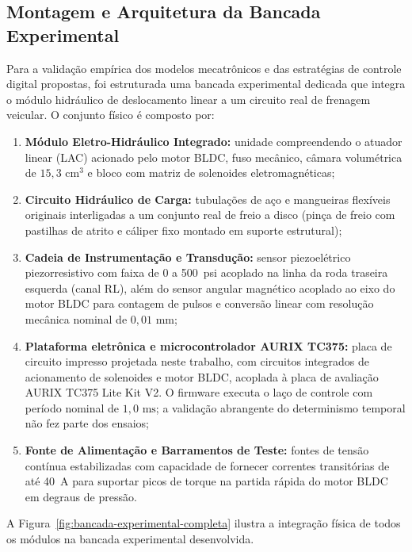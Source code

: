 \subsection{Montagem e Arquitetura da Bancada Experimental}
\label{sec:metodologia-bancada-fisica}

Para a validação empírica dos modelos mecatrônicos e das estratégias de controle digital propostas, foi estruturada uma bancada experimental dedicada que integra o módulo hidráulico de deslocamento linear a um circuito real de frenagem veicular. O conjunto físico é composto por:
\begin{enumerate}
    \item \textbf{Módulo Eletro-Hidráulico Integrado:} unidade compreendendo o atuador linear (LAC) acionado pelo motor BLDC, fuso mecânico, câmara volumétrica de $15{,}3\text{ cm}^3$ e bloco com matriz de solenoides eletromagnéticas;
    \item \textbf{Circuito Hidráulico de Carga:} tubulações de aço e mangueiras flexíveis originais interligadas a um conjunto real de freio a disco (pinça de freio com pastilhas de atrito e cáliper fixo montado em suporte estrutural);
    \item \textbf{Cadeia de Instrumentação e Transdução:} sensor piezoelétrico piezorresistivo com faixa de 0 a 500~psi acoplado na linha da roda traseira esquerda (canal RL), além do sensor angular magnético acoplado ao eixo do motor BLDC para contagem de pulsos e conversão linear com resolução mecânica nominal de $0{,}01\text{ mm}$;
    \item \textbf{Plataforma eletrônica e microcontrolador AURIX TC375:} placa de circuito impresso projetada neste trabalho, com circuitos integrados de acionamento de solenoides e motor BLDC, acoplada à placa de avaliação AURIX TC375 Lite Kit V2. O firmware executa o laço de controle com período nominal de $1{,}0\text{ ms}$; a validação abrangente do determinismo temporal não fez parte dos ensaios;
    \item \textbf{Fonte de Alimentação e Barramentos de Teste:} fontes de tensão contínua estabilizadas com capacidade de fornecer correntes transitórias de até 40~A para suportar picos de torque na partida rápida do motor BLDC em degraus de pressão.
\end{enumerate}

A Figura~\ref{fig:bancada-experimental-completa} ilustra a integração física de todos os módulos na bancada experimental desenvolvida.
\par

